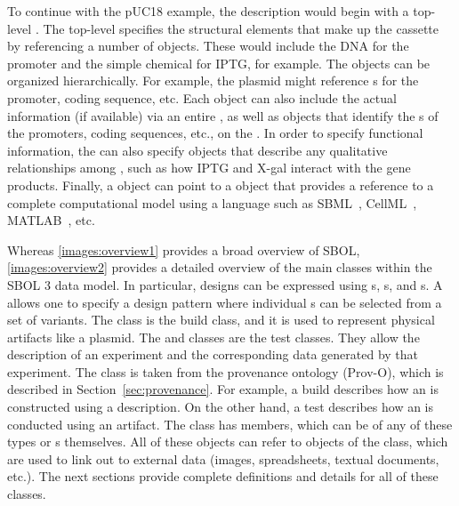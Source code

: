 To continue with the pUC18 example, the description would begin with a top-level .  The top-level  specifies the structural elements that make up the cassette by referencing a number of  objects. These would include the DNA  for the promoter and the simple chemical
 for IPTG, for example.  The  objects can be organized hierarchically.  For example, the plasmid  might reference s for the promoter, coding sequence, etc.  Each  object can also include the actual  information (if available) via an entire  , as well as  objects that identify the s of the promoters, coding sequences, etc., on the .  In order to specify functional information, the  can also specify  objects that describe any qualitative relationships among  , such as how IPTG and X-gal interact with the gene products.  Finally, a  object can point to a  object that provides a reference to a complete computational model using a language such as SBML~\cite{SBML}, CellML~\cite{CellML}, MATLAB~\cite{matlab}, etc.

Whereas \ref{images:overview1} provides a broad overview of SBOL, \ref{images:overview2} provides a detailed overview of the main classes within the SBOL 3 data model.  In particular, designs can be expressed using s, s, and s.  A  allows one to specify a design pattern where individual s can be selected from a set of variants.  The  class is the build class, and it is used to represent physical artifacts like a plasmid.  The  and  classes are the test classes.  They allow the description of an experiment and the corresponding data generated by that experiment.  The  class is taken from the provenance ontology (Prov-O), which is described in Section~\ref{sec:provenance}.  For example, a build  describes how an  is constructed using a  description.  On the other hand, a test  describes how an  is conducted using an  artifact.  The  class has members, which can be of any of these types or s themselves.  All of these objects can refer to objects of the  class, which are used to link out to external data (images, spreadsheets, textual documents, etc.). 
The next sections provide complete definitions and details for all of these classes.

